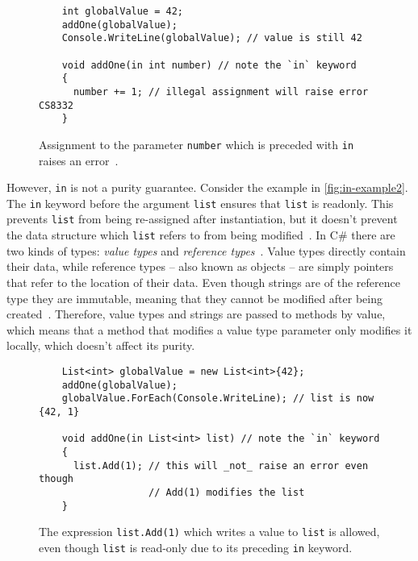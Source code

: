 \documentclass[a4paper,12pt]{article}
\begin{document}
\begin{figure}[H]
  \centering
  \begin{lstlisting}
    int globalValue = 42;
    addOne(globalValue);
    Console.WriteLine(globalValue); // value is still 42

    void addOne(in int number) // note the `in` keyword
    {
      number += 1; // illegal assignment will raise error CS8332
    }
  \end{lstlisting}
  \caption{Assignment to the parameter \texttt{number} which is preceded with \texttt{in} raises an error~\cite{microsoft-in-modifier}.}
  \label{fig:in-example1}
\end{figure}

However, \texttt{in} is not a purity guarantee. Consider the example in \autoref{fig:in-example2}. The \texttt{in} keyword before the argument \texttt{list} ensures that \texttt{list} is readonly. This prevents \texttt{list} from being re-assigned after instantiation, but it doesn't prevent the data structure which \texttt{list} refers to from being modified~\cite{buchanan-static-lists}. In C\# there are two kinds of types: \textit{value types} and \textit{reference types}~\cite{microsoft-types}. Value types directly contain their data, while reference types -- also known as objects -- are simply pointers that refer to the location of their data.  Even though strings are of the reference type they are immutable, meaning that they cannot be modified after being created~\cite{microsoft-strings}. Therefore, value types and strings are passed to methods by value, which means that a method that modifies a value type parameter only modifies it locally, which doesn't affect its purity.

\begin{figure}[H]
  \centering
  \begin{lstlisting}
    List<int> globalValue = new List<int>{42};
    addOne(globalValue);
    globalValue.ForEach(Console.WriteLine); // list is now {42, 1}

    void addOne(in List<int> list) // note the `in` keyword
    {
      list.Add(1); // this will _not_ raise an error even though
                   // Add(1) modifies the list
    }
  \end{lstlisting}
  \caption{The expression \texttt{list.Add(1)} which writes a value to \texttt{list} is allowed, even though \texttt{list} is read-only due to its preceding \texttt{in} keyword.}
  \label{fig:in-example2}
\end{figure}
\end{document}
